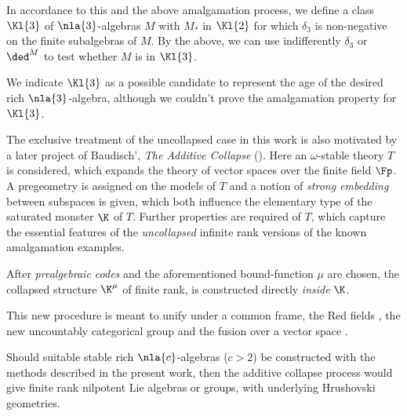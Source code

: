 In accordance to this and the above amalgamation process,
we define a class $\Kl{3}$ of $\nla{3}$-algebras $M$ with $M_{*}$ in $\Kl{2}$ for which
$\delta_{3}$ is non-negative on the finite subalgebras of $M$. By the above, we can use
indifferently $\delta_{3}$ or $\ded^{M}$ to test whether $M$ is in $\Kl{3}$.

We indicate $\Kl{3}$ as a possible candidate to represent the age of the desired rich $\nla{3}$-algebra, although we couldn't
prove the amalgamation property for $\Kl{3}$. 

\crule
The exclusive treatment of the uncollapsed case in this work is also motivated by a later project of Baudisch',
{\em The Additive Collapse} (\cite{addcoll}).
Here an $\omega$-stable theory $T$ is considered, which expands the theory of vector spaces over the finite field $\Fp$.
A pregeometry is assigned on the models of $T$ and a notion of {\em strong embedding}
between subspaces is given, which both influence the elementary type of the saturated monster $\K$ of
$T$. Further properties are required of $T$, which capture the essential features of the {\em uncollapsed} infinite rank versions of the known amalgamation examples. 

After {\em prealgebraic codes} and the aforementioned bound-function $\mu$ are chosen,
the collapsed structure $\K^{\mu}$ of finite rank, is constructed directly {\em inside} $\K$.

This new procedure is meant to unify under a common frame, the Red fields \cite{rf}, the new uncountably categorical group and
the fusion over a vector space \cite{fu}.

Should suitable stable rich $\nla{c}$-algebras ($c>2$) be constructed with the methods described in the present work,
then the additive collapse process would give finite rank nilpotent Lie algebras or groups, with underlying Hrushovski
geometries.